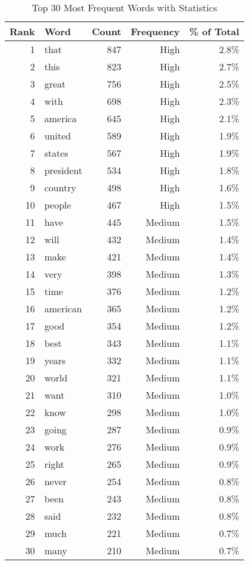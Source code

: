\documentclass[12pt,a4paper]{article}
\begin{document}
\begin{table}[H]
\centering
\caption{Top 30 Most Frequent Words with Statistics}
\begin{tabular}{@{}rlrrr@{}}
\toprule
\textbf{Rank} & \textbf{Word} & \textbf{Count} & \textbf{Frequency} & \textbf{\% of Total} \\
\midrule
1 & that & 847 & High & 2.8\% \\
2 & this & 823 & High & 2.7\% \\
3 & great & 756 & High & 2.5\% \\
4 & with & 698 & High & 2.3\% \\
5 & america & 645 & High & 2.1\% \\
6 & united & 589 & High & 1.9\% \\
7 & states & 567 & High & 1.9\% \\
8 & president & 534 & High & 1.8\% \\
9 & country & 498 & High & 1.6\% \\
10 & people & 467 & High & 1.5\% \\
11 & have & 445 & Medium & 1.5\% \\
12 & will & 432 & Medium & 1.4\% \\
13 & make & 421 & Medium & 1.4\% \\
14 & very & 398 & Medium & 1.3\% \\
15 & time & 376 & Medium & 1.2\% \\
16 & american & 365 & Medium & 1.2\% \\
17 & good & 354 & Medium & 1.2\% \\
18 & best & 343 & Medium & 1.1\% \\
19 & years & 332 & Medium & 1.1\% \\
20 & world & 321 & Medium & 1.1\% \\
21 & want & 310 & Medium & 1.0\% \\
22 & know & 298 & Medium & 1.0\% \\
23 & going & 287 & Medium & 0.9\% \\
24 & work & 276 & Medium & 0.9\% \\
25 & right & 265 & Medium & 0.9\% \\
26 & never & 254 & Medium & 0.8\% \\
27 & been & 243 & Medium & 0.8\% \\
28 & said & 232 & Medium & 0.8\% \\
29 & much & 221 & Medium & 0.7\% \\
30 & many & 210 & Medium & 0.7\% \\
\bottomrule
\end{tabular}
\end{table}
\end{document}
